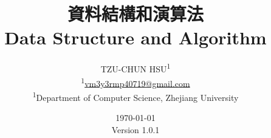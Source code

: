 \documentclass[12pt]{article}
\newcommand{\ver}{\textmd{Version} 1.0.1} %
\begin{document}
\title{\Huge{\textbf{資料結構和演算法}} \\
	\LARGE{\textbf{Data Structure and Algorithm}}
}
\newcommand*{\affaddr}[1]{#1}
\newcommand*{\affmark}[1][*]{\textsuperscript{#1}}
\author{
	TZU-CHUN HSU\affmark[1] \\
	\affmark[1]\href{mailto:vm3y3rmp40719@gmail.com}{vm3y3rmp40719@gmail.com} \\
	\affaddr{\affmark[1]Department of Computer Science, Zhejiang University
	}
}

\date{\mbox{}\vfill\today\\ \ver}

\maketitle
\pagebreak




\end{document}
